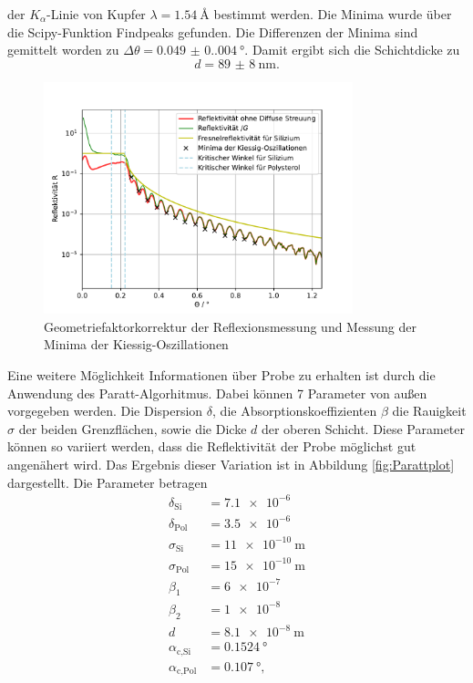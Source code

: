 der $K_{\alpha}$-Linie von Kupfer $\lambda=\SI{1.54}{\angstrom}$ bestimmt werden.\cite{m-tolan2013}
Die Minima wurde über die Scipy-Funktion Findpeaks gefunden. Die Differenzen der Minima sind gemittelt worden zu $\Delta \theta = \SI{0.049(0.004)}{\degree}$.
Damit ergibt sich die Schichtdicke zu 
\begin{equation*}
    d = \SI{89(8)}{\nano\meter}.
\end{equation*}
\begin{figure}[H]
    \centering
    \includegraphics[width=0.8\textwidth]{plots/KorrigierteReflektionsmessung.pdf}
    \caption{Geometriefaktorkorrektur der Reflexionsmessung und Messung der Minima der Kiessig-Oszillationen}
    \label{fig:KorrigierteReflektionsmessung}
\end{figure}
Eine weitere Möglichkeit Informationen über Probe zu erhalten ist durch die Anwendung des Paratt-Algorhitmus. Dabei können 7 Parameter von außen vorgegeben werden. 
Die Dispersion $\delta$, die Absorptionskoeffizienten $\beta$ die Rauigkeit $\sigma$ der beiden Grenzflächen, sowie die Dicke $d$ der oberen Schicht.
Diese Parameter können so variiert werden, dass die Reflektivität der Probe möglichst gut angenähert wird. Das Ergebnis dieser Variation ist in Abbildung 
\ref{fig:Parattplot} dargestellt. Die Parameter betragen
\begin{align*}
    \delta_{\text{Si}} &= \SI{7.1e-6}{} \\
    \delta_{\text{Pol}} &= \SI{3.5e-6}{} \\
    \sigma_{\text{Si}} &= \SI{11e-10}{\meter} \\
    \sigma_{\text{Pol}} &= \SI{15e-10}{\meter} \\
    \beta_1 &= \SI{6e-7}{} \\
    \beta_2 &= \SI{1e-8}{} \\
    d &= \SI{8.1e-8}{\meter}\\
    \alpha_{\text{c,Si}}&=\SI{0.1524}{\degree} \\
    \alpha_{\text{c,Pol}}&=\SI{0.107}{\degree} ,\\
\end{align*}
